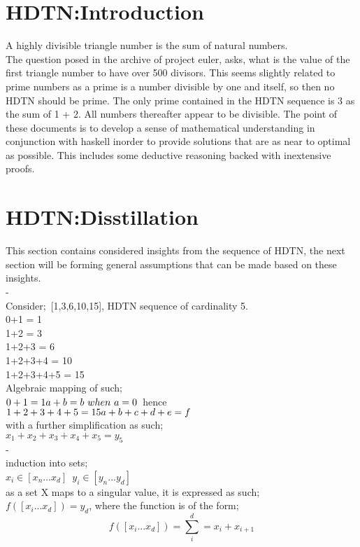 \documentclass{article}
\begin{document}
\maketitle
\newpage
\section{HDTN:Introduction}
A highly divisible triangle number is the sum of natural numbers.\\
The question posed in the archive of project euler, asks, what is the value of the first triangle number to have over 500 divisors.
This seems slightly related to prime numbers as a prime is a number divisible by one and itself, so then no HDTN should be prime.
The only prime contained in the HDTN sequence is 3 as the sum of 1 + 2. All numbers thereafter appear to be divisible.
The point of these documents is to develop a sense of mathematical understanding in conjunction with haskell inorder to provide
solutions that are as near to optimal as possible. This includes some deductive reasoning backed with inextensive proofs. 

\section{HDTN:Disstillation}
This section contains considered insights from the sequence of HDTN, the next section will be forming general assumptions 
that can be made based on these insights.\\
{\color{white}-}\\
Consider;\ [1,3,6,10,15], HDTN sequence of cardinality 5.\\
0+1 = 1\\
1+2 = 3\\
1+2+3 = 6\\
1+2+3+4 = 10\\
1+2+3+4+5 = 15\\
Algebraic mapping of such;\\
$0+1=1\\a+b=b\ when\ a=0$\ hence\\ $1+2+3+4+5=15\\a+b+c+d+e=f$\\ with a further simplification as such;\\
$x_1+x_2+x_3+x_4+x_5=y_5$\\
{\color{white}-}\\
induction into sets;\\
$x_i\in[x_n...x_d]$\ $y_i\in[y_n...y_d]$\\ as a set X maps to a singular value, it is expressed as such;\\
$f([x_i...x_d])=y_d$, where the function is of the form;
\begin{equation}f([x_i...x_d])=\sum_i^d=x_i+x_{i+1}\end{equation}
\newpage
\end{document}
